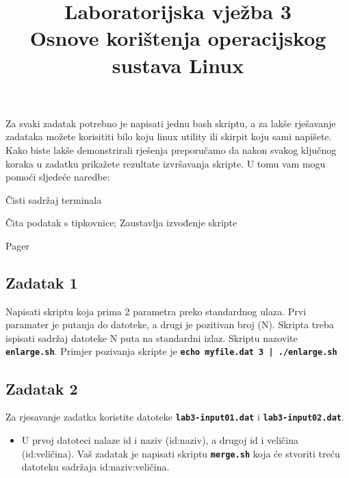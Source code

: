 \documentclass[12pt,a4paper]{article}
\newcommand{\shell}[1]{\texttt{\textbf{#1}}}
\begin{document}
	\title{Laboratorijska vježba 3\\{\small Osnove korištenja operacijskog sustava Linux}\vspace{-2em}}
	\maketitle
	Za svaki zadatak potrebno je napisati jednu bash skriptu, a za lakše rješavanje zadataka možete korisititi bilo koju linux utility ili skirpit koju sami napišete. Kako biste lakše demonstrirali rješenja preporučamo da nakon svakog ključnog koraka u zadatku prikažete rezultate izvršavanja skripte. U tomu vam mogu pomoći sljedeće naredbe:
	\begin{description}[leftmargin=!,labelwidth=4em,itemsep=0em]
		\item[\shell{clear}] Čisti sadržaj terminala
		\item[\shell{read -p}] Čita podatak s tipkovnice; Zaustavlja izvođenje skripte
		\item[\shell{less}] Pager
	\end{description}
	
  \subsection*{Zadatak 1}
  Napisati skriptu koja prima 2 parametra preko standardnog ulaza. Prvi paramater je putanja do datoteke, a drugi je pozitivan broj (N).
  Skripta treba ispisati sadržaj datoteke N puta na standardni izlaz. Skriptu nazovite \shell{enlarge.sh}. Primjer pozivanja skripte je \shell{echo myfile.dat 3 | ./enlarge.sh}

	\subsection*{Zadatak 2}
  Za rjesavanje zadatka koristite datoteke \shell{lab3-input01.dat} i \shell{lab3-input02.dat}.
	\begin{itemize}
    \item U prvoj datoteci nalaze id i naziv (id:naziv), a drugoj id i veličina (id:veličina). Vaš zadatak je napisati skriptu \shell{merge.sh} koja će stvoriti treću datoteku sadržaja id:naziv:veličina.
	\end{itemize}
	
\end{document}
